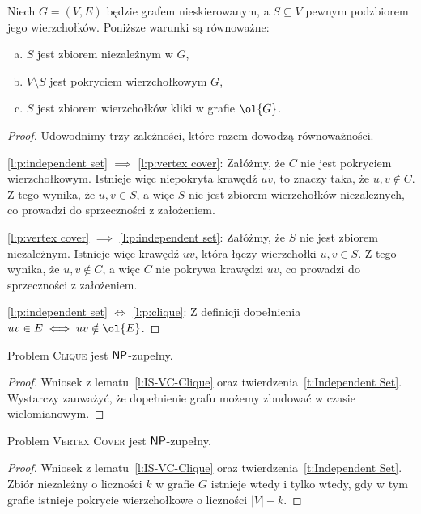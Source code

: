 \begin{lemma}\label{l:IS-VC-Clique}
    Niech $G = (V, E)$ będzie grafem nieskierowanym, a $S \subseteq V$ pewnym podzbiorem jego wierzchołków. Poniższe warunki są równoważne:
    \begin{enumerate}[(a)]
        \item \label{l:p:independent set} $S$ jest zbiorem niezależnym w $G$,
        \item \label{l:p:vertex cover} $V \setminus S$ jest pokryciem wierzchołkowym $G$,
        \item \label{l:p:clique} $S$ jest zbiorem wierzchołków kliki w grafie $\ol{G}$.
    \end{enumerate}
\end{lemma}
\begin{proof}
    Udowodnimy trzy zależności, które razem dowodzą równoważności.

    \ref{l:p:independent set} $\implies$ \ref{l:p:vertex cover}: Załóżmy, że $C$ nie jest pokryciem wierzchołkowym. Istnieje więc niepokryta krawędź $uv$, to znaczy taka, że $u, v \notin C$. Z tego wynika, że $u, v \in S$, a więc $S$ nie jest zbiorem wierzchołków niezależnych, co prowadzi do sprzeczności z założeniem.

    \ref{l:p:vertex cover} $\implies$ \ref{l:p:independent set}: Załóżmy, że $S$ nie jest zbiorem niezależnym. Istnieje więc krawędź $uv$, która łączy wierzchołki $u, v \in S$. Z tego wynika, że $u, v \notin C$, a więc $C$ nie pokrywa krawędzi $uv$, co prowadzi do sprzeczności z założeniem.

    \ref{l:p:independent set} $\iff$ \ref{l:p:clique}: Z definicji dopełnienia $uv \in E \iff uv \notin \ol{E}$.
\end{proof}

\begin{theorem}\label{t:Clique}
    Problem \textsc{Clique} jest $\textsf{NP}$-zupełny.
\end{theorem}
\begin{proof}
    Wniosek z lematu~\ref{l:IS-VC-Clique} oraz twierdzenia~\ref{t:Independent Set}. Wystarczy zauważyć, że dopełnienie grafu możemy zbudować w czasie wielomianowym.
\end{proof}

\begin{theorem}\label{t:Vertex Cover}
    Problem \textsc{Vertex Cover} jest $\textsf{NP}$-zupełny.
\end{theorem}
\begin{proof}
    Wniosek z lematu~\ref{l:IS-VC-Clique} oraz twierdzenia~\ref{t:Independent Set}. Zbiór niezależny o liczności $k$ w grafie $G$ istnieje wtedy i tylko wtedy, gdy w tym grafie istnieje pokrycie wierzchołkowe o liczności $|V| - k$.
\end{proof}

